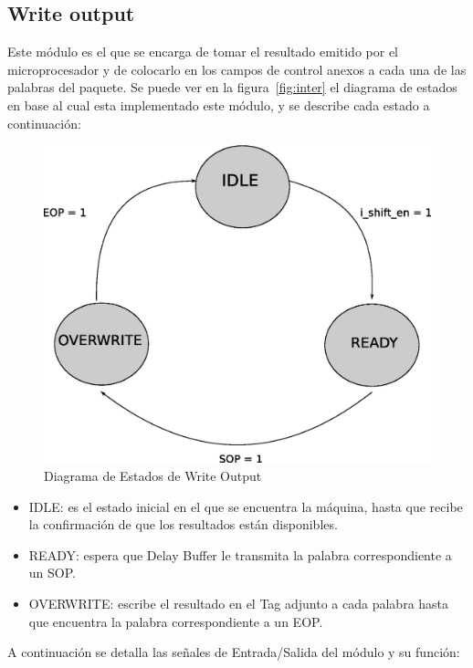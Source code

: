 \newpage

\subsection{Write output}

Este módulo es el que se encarga de tomar el resultado emitido por el microprocesador y de colocarlo en los campos de control anexos a cada una de las palabras del paquete. Se puede ver en la figura~\ref{fig:inter} el diagrama de estados en base al cual esta implementado este módulo, y se describe cada estado a continuación:

\begin{figure}[H]
  \centering
	\includegraphics[scale=0.45]{3-arquitectura/graf/estwritecompleto.eps}
  \caption{Diagrama de Estados de Write Output}
  \label{fig:estuplink}
\end{figure}

\begin{itemize}
	\item IDLE: es el estado inicial en el que se encuentra la máquina, hasta que recibe la confirmación de que los resultados están disponibles.
	\item READY: espera que Delay Buffer le transmita la palabra correspondiente a un SOP. 
	\item OVERWRITE: escribe el resultado en el Tag adjunto a cada palabra hasta que encuentra la palabra correspondiente a un EOP. 
\end{itemize}

A continuación se detalla las señales de Entrada/Salida del módulo y su función:

